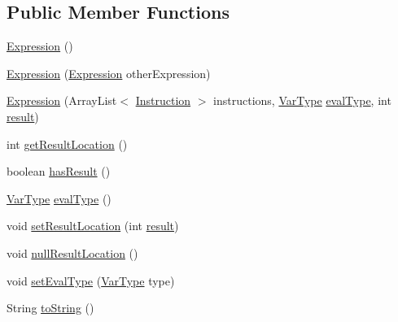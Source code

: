 \subsection*{Public Member Functions}
\begin{DoxyCompactItemize}
\item 
\hyperlink{classcas_1_1parser_1_1parser__containers_1_1_expression_a3000b1d4192eca32d9a6e846f4d80724}{Expression} ()
\item 
\hyperlink{classcas_1_1parser_1_1parser__containers_1_1_expression_a1942fa3e6c146e3469a8ecb00bf59f07}{Expression} (\hyperlink{classcas_1_1parser_1_1parser__containers_1_1_expression}{Expression} other\-Expression)
\item 
\hyperlink{classcas_1_1parser_1_1parser__containers_1_1_expression_af0da682360425f92a9a5c2590c26c665}{Expression} (Array\-List$<$ \hyperlink{classcas_1_1instruction_1_1_instruction}{Instruction} $>$ instructions, \hyperlink{enumcas_1_1machine_1_1_virtual_machine_1_1_var_type}{Var\-Type} \hyperlink{classcas_1_1parser_1_1parser__containers_1_1_expression_aa6d0024a94d5ac5dce65134687996048}{eval\-Type}, int \hyperlink{classcas_1_1parser_1_1parser__containers_1_1_expression_a5ca245757ba655aa1cf856670b039913}{result})
\item 
int \hyperlink{classcas_1_1parser_1_1parser__containers_1_1_expression_ad32e3e85adbd31c0a7bf4c8cc54fd807}{get\-Result\-Location} ()
\item 
boolean \hyperlink{classcas_1_1parser_1_1parser__containers_1_1_expression_a37b6a69fc045236645b29a6ea97eaa29}{has\-Result} ()
\item 
\hyperlink{enumcas_1_1machine_1_1_virtual_machine_1_1_var_type}{Var\-Type} \hyperlink{classcas_1_1parser_1_1parser__containers_1_1_expression_aa82d0811166799fe20226aa21b08d381}{eval\-Type} ()
\item 
void \hyperlink{classcas_1_1parser_1_1parser__containers_1_1_expression_a6affc96eeef61b44ab6ef45792dd8fc9}{set\-Result\-Location} (int \hyperlink{classcas_1_1parser_1_1parser__containers_1_1_expression_a5ca245757ba655aa1cf856670b039913}{result})
\item 
void \hyperlink{classcas_1_1parser_1_1parser__containers_1_1_expression_a30c794fe9ffb590f5454450abbd2940c}{null\-Result\-Location} ()
\item 
void \hyperlink{classcas_1_1parser_1_1parser__containers_1_1_expression_a967117019abe13cf427292bbd9966415}{set\-Eval\-Type} (\hyperlink{enumcas_1_1machine_1_1_virtual_machine_1_1_var_type}{Var\-Type} type)
\item 
String \hyperlink{classcas_1_1parser_1_1parser__containers_1_1_expression_aecd789d5647e365b7b24f2ca5cb53d6a}{to\-String} ()
\end{DoxyCompactItemize}
